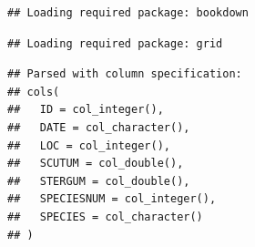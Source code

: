\begin{Shaded}
\begin{Highlighting}[]
\end{Highlighting}
\end{Shaded}

\begin{verbatim}
## Loading required package: bookdown
\end{verbatim}

\begin{Shaded}
\begin{Highlighting}[]
\NormalTok{(}\NormalTok{, }\NormalTok{)}
\NormalTok{(}\NormalTok{, }\NormalTok{)}
\NormalTok{(}\NormalTok{, }\NormalTok{)}
\NormalTok{(}\NormalTok{, }\NormalTok{)}
\end{Highlighting}
\end{Shaded}

\begin{verbatim}
## Loading required package: grid
\end{verbatim}

\begin{Shaded}
\begin{Highlighting}[]
\NormalTok{(}\NormalTok{, }\NormalTok{)}
\NormalTok{(}\NormalTok{)}
\StringTok{ }\NormalTok{(}\NormalTok{)}
\end{Highlighting}
\end{Shaded}

\begin{verbatim}
## Parsed with column specification:
## cols(
##   ID = col_integer(),
##   DATE = col_character(),
##   LOC = col_integer(),
##   SCUTUM = col_double(),
##   STERGUM = col_double(),
##   SPECIESNUM = col_integer(),
##   SPECIES = col_character()
## )
\end{verbatim}

